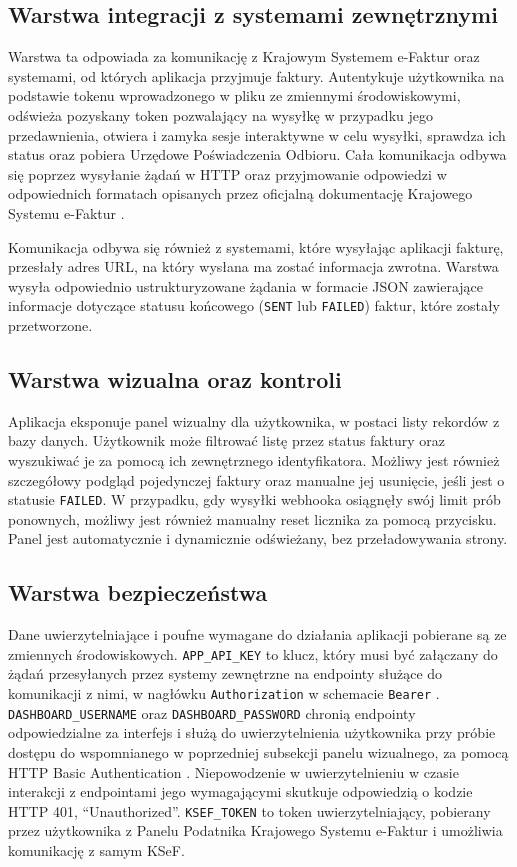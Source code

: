 \subsection{Warstwa integracji z systemami zewnętrznymi}
Warstwa ta odpowiada za komunikację z Krajowym Systemem e-Faktur oraz systemami, od których aplikacja przyjmuje faktury. Autentykuje użytkownika na podstawie tokenu wprowadzonego w pliku ze zmiennymi środowiskowymi, odświeża pozyskany token pozwalający na wysyłkę w przypadku jego przedawnienia, otwiera i zamyka sesje interaktywne w celu wysyłki, sprawdza ich status oraz pobiera Urzędowe Poświadczenia Odbioru. Cała komunikacja odbywa się poprzez wysyłanie żądań w HTTP oraz przyjmowanie odpowiedzi w odpowiednich formatach opisanych przez oficjalną dokumentację Krajowego Systemu e-Faktur \parencite{ksef_api_docs}. 

Komunikacja odbywa się również z systemami, które wysyłając aplikacji fakturę, przesłały adres URL, na który wysłana ma zostać informacja zwrotna. Warstwa wysyła odpowiednio ustrukturyzowane żądania w formacie JSON zawierające informacje dotyczące statusu końcowego (\texttt{SENT} lub \texttt{FAILED}) faktur, które zostały przetworzone.

\subsection{Warstwa wizualna oraz kontroli}
Aplikacja eksponuje panel wizualny dla użytkownika, w postaci listy rekordów z bazy danych. Użytkownik może filtrować listę przez status faktury oraz wyszukiwać je za pomocą ich zewnętrznego identyfikatora. Możliwy jest również szczegółowy podgląd pojedynczej faktury oraz manualne jej usunięcie, jeśli jest o statusie \texttt{FAILED}. W przypadku, gdy wysyłki webhooka osiągnęły swój limit prób ponownych, możliwy jest również manualny reset licznika za pomocą przycisku. Panel jest automatycznie i dynamicznie odświeżany, bez przeładowywania strony.  

\subsection{Warstwa bezpieczeństwa}
Dane uwierzytelniające i poufne wymagane do działania aplikacji pobierane są ze zmiennych środowiskowych. \texttt{APP\_API\_KEY} to klucz, który musi być załączany do żądań przesyłanych przez systemy zewnętrzne na endpointy służące do komunikacji z nimi, w nagłówku \texttt{Authorization} w schemacie \texttt{Bearer} \parencite{rfc6750}. \texttt{DASHBOARD\_USERNAME} oraz \texttt{DASHBOARD\_PASSWORD} chronią endpointy odpowiedzialne za interfejs i służą do uwierzytelnienia użytkownika przy próbie dostępu do wspomnianego w poprzedniej subsekcji panelu wizualnego, za pomocą HTTP Basic Authentication \parencite{rfc7617}. Niepowodzenie w uwierzytelnieniu w czasie interakcji z endpointami jego wymagającymi skutkuje odpowiedzią o kodzie HTTP 401, \enquote{Unauthorized}. \texttt{KSEF\_TOKEN} to token uwierzytelniający, pobierany przez użytkownika z Panelu Podatnika Krajowego Systemu e-Faktur i umożliwia komunikację z samym KSeF.

